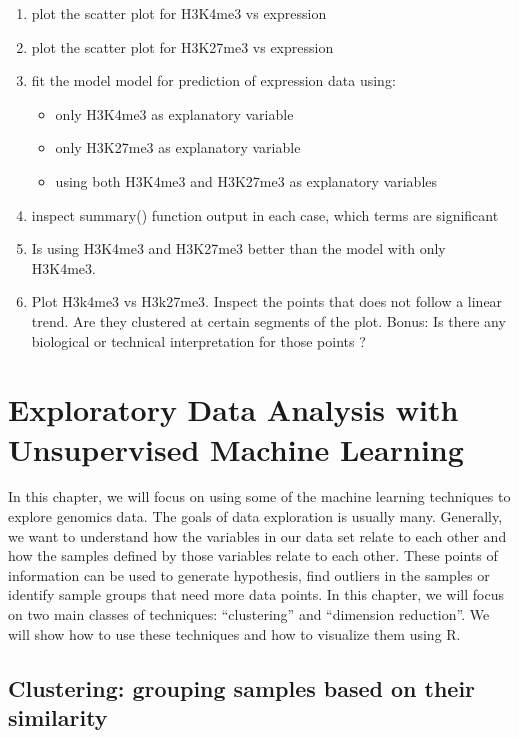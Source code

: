 \documentclass[12pt,]{krantz}
\providecommand{\tightlist}{%
  \setlength{\itemsep}{0pt}\setlength{\parskip}{0pt}}
\begin{document}
\begin{enumerate}
\def\labelenumi{\arabic{enumi}.}
\tightlist
\item
  plot the scatter plot for H3K4me3 vs expression
\item
  plot the scatter plot for H3K27me3 vs expression
\item
  fit the model model for prediction of expression data using:

  \begin{itemize}
  \tightlist
  \item
    only H3K4me3 as explanatory variable
  \item
    only H3K27me3 as explanatory variable
  \item
    using both H3K4me3 and H3K27me3 as explanatory variables
  \end{itemize}
\item
  inspect summary() function output in each case, which terms are significant
\item
  Is using H3K4me3 and H3K27me3 better than the model with only H3K4me3.
\item
  Plot H3k4me3 vs H3k27me3. Inspect the points that does not
  follow a linear trend. Are they clustered at certain segments
  of the plot. Bonus: Is there any biological or technical interpretation
  for those points ?
\end{enumerate}

\hypertarget{unsupervisedLearning}{%
\chapter{Exploratory Data Analysis with Unsupervised Machine Learning}\label{unsupervisedLearning}}

In this chapter, we will focus on using some of the machine learning techniques to explore genomics data. The goals of data exploration is usually many. Generally, we want to understand how the variables in our data set relate to each other and how the samples defined by those variables relate to each other. These points of information can be used to generate hypothesis, find outliers in the samples or identify sample groups that need more data points. In this chapter, we will focus on two main classes of techniques: ``clustering'' and ``dimension reduction''. We will show how to use these techniques and how to visualize them using R.

\hypertarget{clustering-grouping-samples-based-on-their-similarity}{%
\section{Clustering: grouping samples based on their similarity}\label{clustering-grouping-samples-based-on-their-similarity}}
\end{document}
